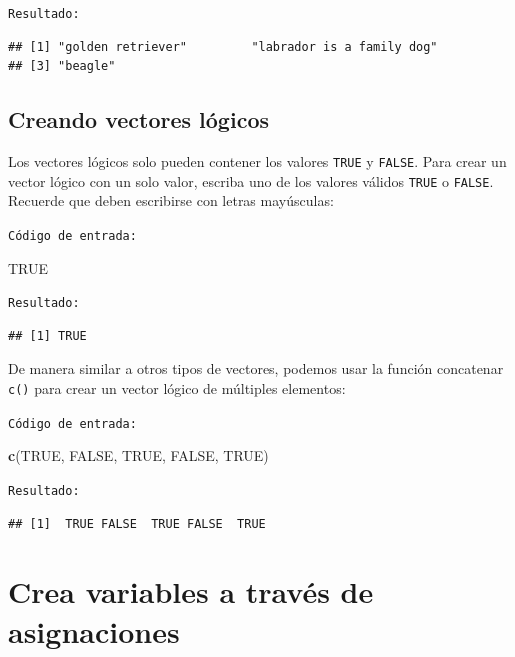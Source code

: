 \documentclass[
]{book}
\newenvironment{Shaded}{\begin{snugshade}}{\end{snugshade}}
\newcommand{\KeywordTok}[1]{\textcolor[rgb]{0.13,0.29,0.53}{\textbf{#1}}}
\newcommand{\NormalTok}[1]{#1}
\newcommand{\OtherTok}[1]{\textcolor[rgb]{0.56,0.35,0.01}{#1}}
\begin{document}
\texttt{Resultado:}

\begin{verbatim}
## [1] "golden retriever"         "labrador is a family dog"
## [3] "beagle"
\end{verbatim}

\hypertarget{creando-vectores-luxf3gicos}{%
\subsection{Creando vectores lógicos}\label{creando-vectores-luxf3gicos}}

Los vectores lógicos solo pueden contener los valores \texttt{TRUE} y \texttt{FALSE}. Para crear un vector lógico con un solo valor, escriba uno de los valores válidos \texttt{TRUE} o \texttt{FALSE}. Recuerde que deben escribirse con letras mayúsculas:

\texttt{Código\ de\ entrada:}

\begin{Shaded}
\begin{Highlighting}[]
\OtherTok{TRUE}
\end{Highlighting}
\end{Shaded}

\texttt{Resultado:}

\begin{verbatim}
## [1] TRUE
\end{verbatim}

De manera similar a otros tipos de vectores, podemos usar la función concatenar \texttt{c()} para crear un vector lógico de múltiples elementos:

\texttt{Código\ de\ entrada:}

\begin{Shaded}
\begin{Highlighting}[]
\KeywordTok{c}\NormalTok{(}\OtherTok{TRUE}\NormalTok{, }\OtherTok{FALSE}\NormalTok{, }\OtherTok{TRUE}\NormalTok{, }\OtherTok{FALSE}\NormalTok{, }\OtherTok{TRUE}\NormalTok{)   }
\end{Highlighting}
\end{Shaded}

\texttt{Resultado:}

\begin{verbatim}
## [1]  TRUE FALSE  TRUE FALSE  TRUE
\end{verbatim}

\hypertarget{crea-variables-a-travuxe9s-de-asignaciones}{%
\section{Crea variables a través de asignaciones}\label{crea-variables-a-travuxe9s-de-asignaciones}}
\end{document}
